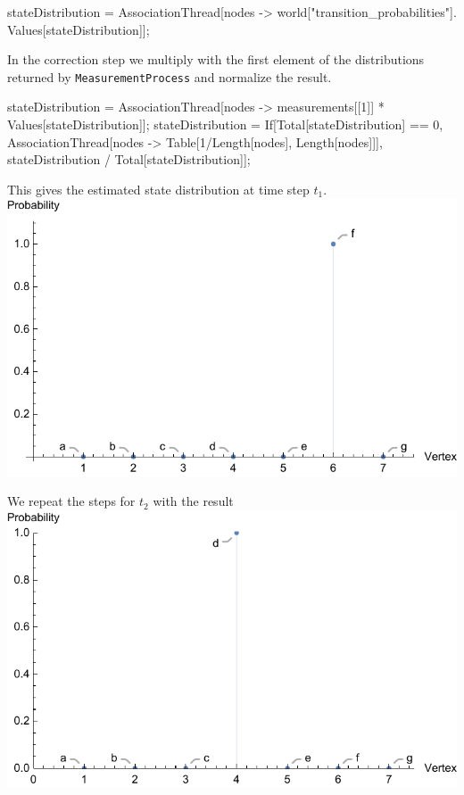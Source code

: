 \documentclass{tstextbook}
\begin{document}
\begin{example}
\begin{mathematica}
stateDistribution = AssociationThread[nodes -> world["transition_probabilities"].
                                      Values[stateDistribution]];
\end{mathematica}

In the correction step we multiply with the first element of the distributions returned by \texttt{MeasurementProcess} and normalize the result.  

\begin{mathematica}
stateDistribution = AssociationThread[nodes -> measurements[[1]] *
                                      Values[stateDistribution]];
stateDistribution = If[Total[stateDistribution] == 0,
                       AssociationThread[nodes -> Table[1/Length[nodes],
                                                        Length[nodes]]],
                       stateDistribution / Total[stateDistribution]];
\end{mathematica}

This gives the estimated state distribution at time step $t_1$.\\

\includegraphics[scale=0.8, center]{images/state_estimate_t1.pdf}

We repeat the steps for $t_2$ with the result\\

\includegraphics[scale=0.8, center]{images/state_estimate_t2.pdf}


\end{example}
\end{document}

